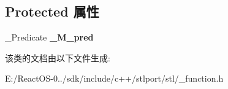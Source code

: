 \subsection*{Protected 属性}
\begin{DoxyCompactItemize}
\item 
\mbox{\label{classbinary__negate_aae3196a805a9c415038bed25c4283c16}} 
\+\_\+\+Predicate {\bfseries \+\_\+\+M\+\_\+pred}
\end{DoxyCompactItemize}


该类的文档由以下文件生成\+:\begin{DoxyCompactItemize}
\item 
E\+:/\+React\+O\+S-\/0../sdk/include/c++/stlport/stl/\+\_\+function.\+h\end{DoxyCompactItemize}
